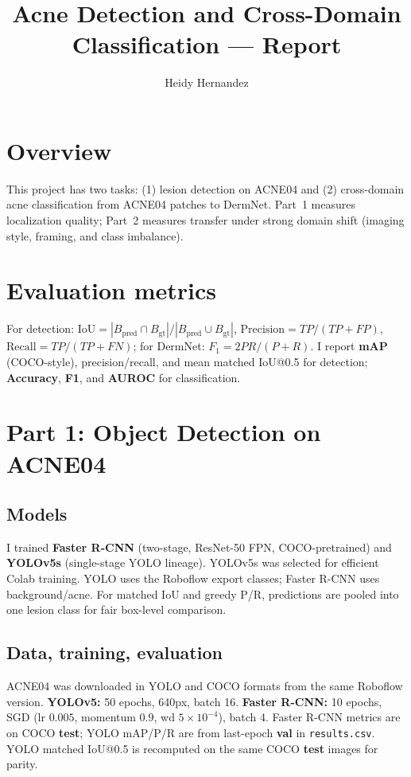 \documentclass[10pt,twocolumn]{article}
\title{\vspace{-1.7em}Acne Detection and Cross-Domain Classification --- Report\vspace{-0.7em}}
\author{Heidy Hernandez}
\date{}
\begin{document}
\twocolumn[\maketitle\vspace{-1.2\baselineskip}]

\section{Overview}

This project has two tasks: (1) lesion detection on ACNE04 and (2) cross-domain acne classification from ACNE04 patches to DermNet. Part~1 measures localization quality; Part~2 measures transfer under strong domain shift (imaging style, framing, and class imbalance).

\section{Evaluation metrics}

{\small For detection: $\mathrm{IoU}=|B_{\text{pred}}\cap B_{\text{gt}}|/|B_{\text{pred}}\cup B_{\text{gt}}|$, $\mathrm{Precision}=TP/(TP+FP)$, $\mathrm{Recall}=TP/(TP+FN)$; for DermNet: $F_1=2PR/(P+R)$. I report \textbf{mAP} (COCO-style), precision/recall, and mean matched IoU@0.5 for detection; \textbf{Accuracy}, \textbf{F1}, and \textbf{AUROC} for classification.}

\section{Part 1: Object Detection on ACNE04}

\subsection{Models}

I trained \textbf{Faster R-CNN} (two-stage, ResNet-50 FPN, COCO-pretrained) and \textbf{YOLOv5s} (single-stage YOLO lineage). YOLOv5s was selected for efficient Colab training. YOLO uses the Roboflow export classes; Faster R-CNN uses background/acne. For matched IoU and greedy P/R, predictions are pooled into one lesion class for fair box-level comparison.

\subsection{Data, training, evaluation}

ACNE04 was downloaded in YOLO and COCO formats from the same Roboflow version. \textbf{YOLOv5:} 50 epochs, 640px, batch 16. \textbf{Faster R-CNN:} 10 epochs, SGD (lr $0.005$, momentum $0.9$, wd $5{\times}10^{-4}$), batch 4. Faster R-CNN metrics are on COCO \textbf{test}; YOLO mAP/P/R are from last-epoch \textbf{val} in \texttt{results.csv}. YOLO matched IoU@0.5 is recomputed on the same COCO \textbf{test} images for parity.
\end{document}
